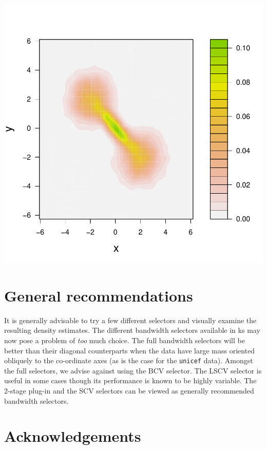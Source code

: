 \documentclass[a4paper,11pt]{article}
\let\code=\texttt
\newcommand{\pkg}[1]{{\normalfont\fontseries{b}\selectfont #1}}
\begin{document}
\begin{center}  
\includegraphics{kde-026}
\end{center}



\section{General recommendations}

It is generally advisable to try a few 
different selectors and visually examine the resulting density estimates. 
The different bandwidth selectors available in \pkg{ks} may
now pose a problem of \emph{too} much choice.
The full bandwidth selectors will be better than their diagonal counterparts
when the data have large mass oriented obliquely to the co-ordinate axes 
(as is the case for the \code{unicef} data). 
Amongst the full selectors, we advise against using the BCV selector. 
The LSCV selector is useful in some cases though its performance is 
known to be highly variable. The 2-stage plug-in and the SCV selectors
can be viewed as generally recommended bandwidth selectors.


\section{Acknowledgements}
\end{document}

